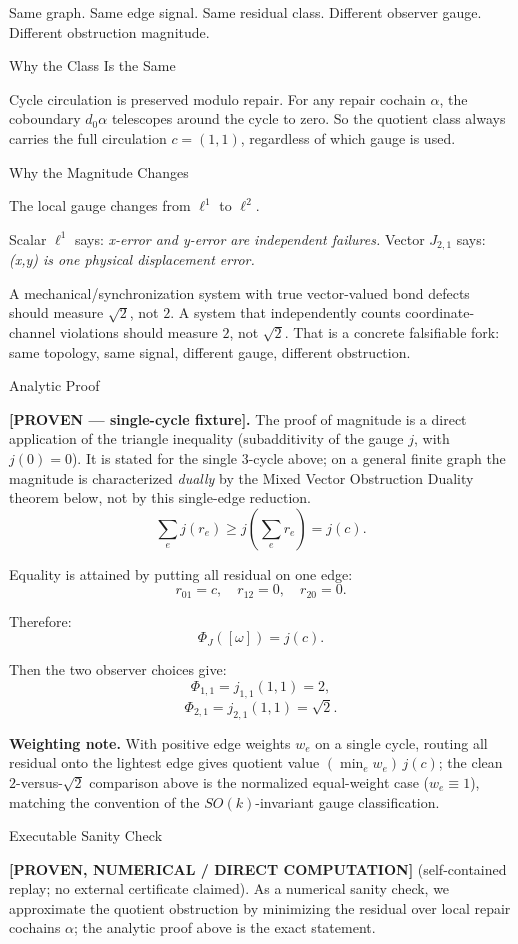 \documentclass[
  11pt,
]{article}
\begin{document}
Same graph. Same edge signal. Same residual class. Different observer gauge. Different obstruction magnitude.

Why the Class Is the Same

Cycle circulation is preserved modulo repair. For any repair cochain \(\alpha\), the coboundary \(d_0\alpha\) telescopes around the cycle to zero. So the quotient class always carries the full circulation \(c = (1,1)\), regardless of which gauge is used.

Why the Magnitude Changes

The local gauge changes from \(\ell^1\) to \(\ell^2\).

Scalar \(\ell^1\) says: \emph{x-error and y-error are independent failures.}
Vector \(J_{2,1}\) says: \emph{(x,y) is one physical displacement error.}

A mechanical/synchronization system with true vector-valued bond defects should measure \(\sqrt{2}\), not \(2\). A system that independently counts coordinate-channel violations should measure \(2\), not \(\sqrt{2}\). That is a concrete falsifiable fork: same topology, same signal, different gauge, different obstruction.

Analytic Proof

\textbf{{[}PROVEN --- single-cycle fixture{]}.} The proof of magnitude is a direct application of the triangle inequality (subadditivity of the gauge \(j\), with \(j(0)=0\)). It is stated for the single 3-cycle above; on a general finite graph the magnitude is characterized \emph{dually} by the Mixed Vector Obstruction Duality theorem below, not by this single-edge reduction.
\[
\sum_e j(r_e)\ge j\left(\sum_e r_e\right)=j(c).
\]

Equality is attained by putting all residual on one edge:
\[
r_{01}=c,\quad r_{12}=0,\quad r_{20}=0.
\]

Therefore:
\[
\Phi_J([\omega])=j(c).
\]

Then the two observer choices give:
\[
\Phi_{1,1}=j_{1,1}(1,1)=2,
\]
\[
\Phi_{2,1}=j_{2,1}(1,1)=\sqrt{2}.
\]

\textbf{Weighting note.} With positive edge weights \(w_e\) on a single cycle, routing all residual onto the lightest edge gives quotient value \((\min_e w_e)\,j(c)\); the clean \(2\)-versus-\(\sqrt2\) comparison above is the normalized equal-weight case (\(w_e\equiv 1\)), matching the convention of the \(SO(k)\)-invariant gauge classification.

Executable Sanity Check

\textbf{{[}PROVEN, NUMERICAL / DIRECT COMPUTATION{]}} (self-contained replay; no external certificate claimed). As a numerical sanity check, we approximate the quotient obstruction by minimizing the residual over local repair cochains \(\alpha\); the analytic proof above is the exact statement.
\end{document}
